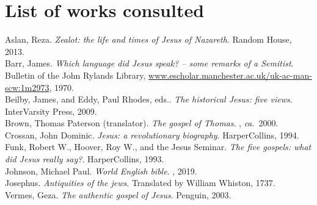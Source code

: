 \documentclass[10pt,twoside]{article} %
\begin{document}
\vfill\pagebreak\section*{List of works consulted}

\newcommand{\refbook}[4]{#1. \emph{#2}. #3, #4.\\} %

\refbook{Aslan, Reza}{Zealot: the life and times of Jesus of Nazareth}{Random House}{2013}

\refbook{Barr, James}{Which language did Jesus speak? -- some remarks of a Semitist}{Bulletin of the John Rylands Library,
\url{www.escholar.manchester.ac.uk/uk-ac-man-scw:1m2973}}{1970}

\refbook{Beilby, James, and Eddy, Paul Rhodes, eds.}{The historical Jesus: five views}{InterVarsity Press}{2009}

\refbook{Brown, Thomas Paterson (translator)}{The gospel of Thomas}{}{\emph{ca}.~2000}

\refbook{Crossan, John Dominic}{Jesus: a revolutionary biography}{HarperCollins}{1994}

\refbook{Funk, Robert W., Hoover, Roy W., and the Jesus Seminar}{The five gospels: what did Jesus really say?}{HarperCollins}{1993}

\refbook{Johnson, Michael Paul}{World English bible}{}{2019}

\refbook{Josephus}{Antiquities of the jews}{Translated by William Whiston}{1737}

\refbook{Vermes, Geza}{The authentic gospel of Jesus}{Penguin}{2003}

\vfill\pagebreak\printindex

\vfill\pagebreak\printindex[texts]
\end{document}
